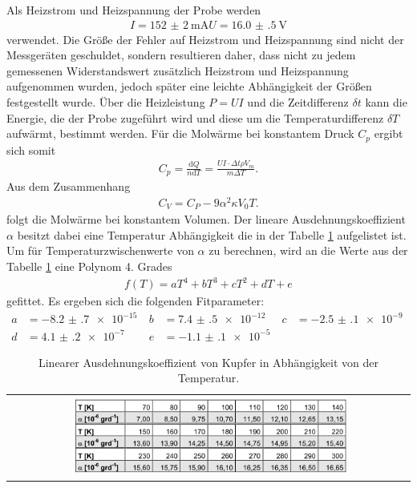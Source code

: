 Als Heizstrom und Heizspannung der Probe
werden
\begin{align}
  I = \SI{152(2)}{\milli\ampere}
  U = \SI{16.0(5)}{\volt}
\end{align}
verwendet. Die Größe
der Fehler auf Heizstrom und Heizspannung
sind nicht der Messgeräten geschuldet,
sondern resultieren daher, dass nicht
zu jedem gemessenen Widerstandswert
zusätzlich Heizstrom und Heizspannung
aufgenommen wurden, jedoch später
eine leichte Abhängigkeit
der Größen festgestellt wurde.
Über die Heizleistung $P=UI$
und die Zeitdifferenz $\delta t$
kann die Energie, die der Probe zugeführt wird
und diese um die Temperaturdifferenz
$\delta T$ aufwärmt, bestimmt werden.
Für die Molwärme bei konstantem
Druck $C_p$ ergibt sich somit
\begin{align}
  C_p =\frac{\text{d} Q}{n \text{d} T }  = \frac{UI \cdot \Delta t \rho V_m }{m \Delta T}. \label{eqn:C_p}
\end{align}
Aus dem Zusammenhang
\begin{align}
C_V = C_P- 9\alpha^2 \kappa V_0 T \label{eqn:C_V}.
\end{align}
folgt die Molwärme bei konstantem Volumen.
Der lineare Ausdehnungskoeffizient $\alpha$ besitzt dabei
eine Temperatur Abhängigkeit die in der Tabelle \ref{fig:alpha}
aufgelistet ist. Um für Temperaturzwischenwerte von $\alpha$
zu berechnen, wird an die Werte aus der Tabelle \ref{fig:alpha}
eine Polynom 4. Grades
\begin{align}
f(T) = a T^4 + b  T^3 + c  T^2 + d T + e \label{eqn:poly4}
\end{align}
gefittet.
Es ergeben sich die folgenden Fitparameter:
\begin{align}
 a&=\SI{-8.2(7)e-15}{}
  & b&=\SI{7.4(5)e-12}{}   & c &=\SI{-2.5(1)e-9}{}  \\
 d&=\SI{4.1(2)e-7}{}    & e&=\SI{-1.1(1)e-5}{}
\end{align}
\begin{table}
  \centering
  \caption{Linearer Ausdehnungskoeffizient von Kupfer in Abhängigkeit von der Temperatur.}
  \label{fig:alpha}
  \centering
  \begin{tabular}{c}
  \includegraphics[width=0.7\textwidth]{alpha.PNG}
\end{tabular}
\end{table}

